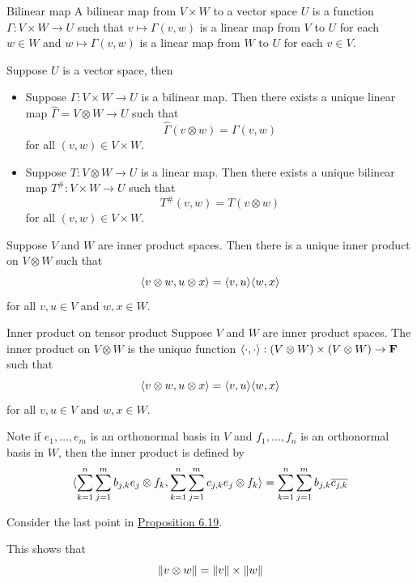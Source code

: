 \documentclass[12pt,a4paper]{article}
\begin{document}
    \begin{defi}{Bilinear map}
        A bilinear map from $V\times W$ to a vector space $U$ is a function $\Gamma:V\times W\to U$ such that $v\mapsto\Gamma(v,w)$ is a linear map from $V$ to $U$ for each $w\in W$ and $w\mapsto\Gamma(v,w)$ is a linear map from $W$ to $U$ for each $v\in V$.
    \end{defi}
    \hfill

    \begin{prop}
        Suppose $U$ is a vector space, then
        \begin{itemize}
            \item Suppose $\Gamma:V\times W\to U$ is a bilinear map. Then there exists a unique linear map $\hat{\Gamma}=V\otimes W\to U$ such that
            $$
            \hat{\Gamma}(v\otimes w)=\Gamma(v,w)
            $$
            for all $(v,w)\in V\times W$.
            \item Suppose $T:V\otimes W\to U$ is a linear map. Then there exists a unique bilinear map $T^\#:V\times W\to U$ such that
            $$
            T^\#(v,w)=T(v\otimes w)
            $$
            for all $(v,w)\in V\times W$.
        \end{itemize}
    \end{prop}
    \hfill
       
    \begin{prop}
        Suppose $V$ and $W$ are inner product spaces. Then there is a unique inner product on $V\otimes W$ such that
        $$
        \langle v\otimes w,u\otimes x\rangle=\langle v,u\rangle\langle w,x\rangle
        $$
        for all $v,u\in V$ and $w,x\in W$.
    \end{prop}
    \begin{defi}{Inner product on tensor product}
        Suppose $V$ and $W$ are inner product spaces. The inner product on $V\otimes W$ is the unique function $\langle\cdot,\cdot\rangle:(V\otimes W)\times(V\otimes W)\to\mathbf{F}$ such that
        $$
        \langle v\otimes w,u\otimes x\rangle=\langle v,u\rangle\langle w,x\rangle
        $$
        for all $v,u\in V$ and $w,x\in W$.
    \end{defi}
    \begin{remark}
        Note if $e_1,\dots,e_m$ is an orthonormal basis in $V$ and $f_1,\dots,f_n$ is an orthonormal basis in $W$, then the inner product is defined by
        $$
        \langle\sum_{k=1}^n\sum_{j=1}^mb_{j,k}e_{j}\otimes f_{k},\sum_{k=1}^n\sum_{j=1}^mc_{j,k}e_{j}\otimes f_{k}\rangle=\sum_{k=1}^n\sum_{j=1}^mb_{j,k}\overline{c_{j,k}}
        $$
    \end{remark}
    \begin{remark}
        Consider the last point in \hyperref[6.19]{Proposition 6.19}.
    \end{remark}
    \begin{remark}
        This shows that
        $$
        \left\lVert v\otimes w\right\rVert=\left\lVert v\right\rVert\times\left\lVert w\right\rVert
        $$
    \end{remark}
    \hfill
\end{document}
